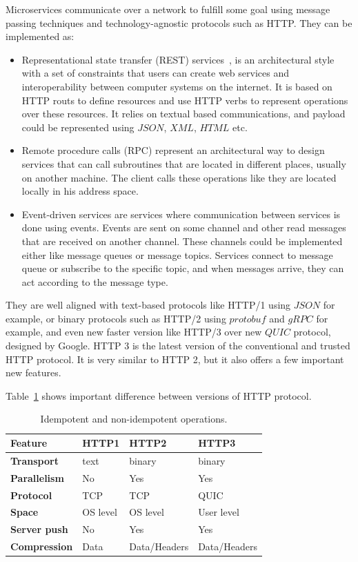 Microservices communicate over a network to fulfill some goal using message passing techniques and technology-agnostic protocols such as HTTP. They can be implemented as:

\begin{itemize}
	\item Representational state transfer (REST) services~\cite{AdamczykSJH11}, is an architectural style with a set of constraints that users can create web services and interoperability between computer systems on the internet. It is based on HTTP routs to define resources and use HTTP verbs to represent operations over these resources. It relies on textual based communications, and payload could be represented using $JSON$, $XML$, $HTML$ etc.
	\item Remote procedure calls (RPC) represent an architectural way to design services that can call subroutines that are located in different places, usually on another machine. The client calls these operations like they are located locally in his address space.
	\item Event-driven services are services where communication between services is done using events. Events are sent on some channel and other read messages that are received on another channel. These channels could be implemented either like message queues or message topics. Services connect to message queue or subscribe to the specific topic, and when messages arrive, they can act according to the message type.
\end{itemize}
 
\noindent
They are well aligned with text-based protocols like HTTP/1 using $JSON$ for example, or binary protocols such as HTTP/2 using $protobuf$ and $gRPC$ for example, and even new faster version like HTTP/3 over new $QUIC$ protocol, designed by Google. HTTP 3 is the latest version of the conventional and trusted HTTP protocol. It is very similar to HTTP 2, but it also offers a few important new features. 

Table~\ref{tab:table9} shows important difference between versions of HTTP protocol.
 
 \begin{table}[h!]
 	\begin{center}
 		\begin{tabular}{l|l|l|l}
 			\textbf{Feature} & \textbf{HTTP1} & \textbf{HTTP2} & \textbf{HTTP3}\\
 			\hline
 			\textbf{Transport} & text & binary & binary\\
 			\textbf{Parallelism} & No & Yes & Yes\\
 			\textbf{Protocol} & TCP & TCP & QUIC \\
 			\textbf{Space} & OS level & OS level & User level\\
 			\textbf{Server push} & No & Yes & Yes\\
 			\textbf{Compression} & Data & Data/Headers & Data/Headers\\
 		\end{tabular}
 	\end{center}
 	\vspace{-0.5cm}
 	\caption{Idempotent and non-idempotent operations.}
 	\label{tab:table9}
 \end{table}
 
